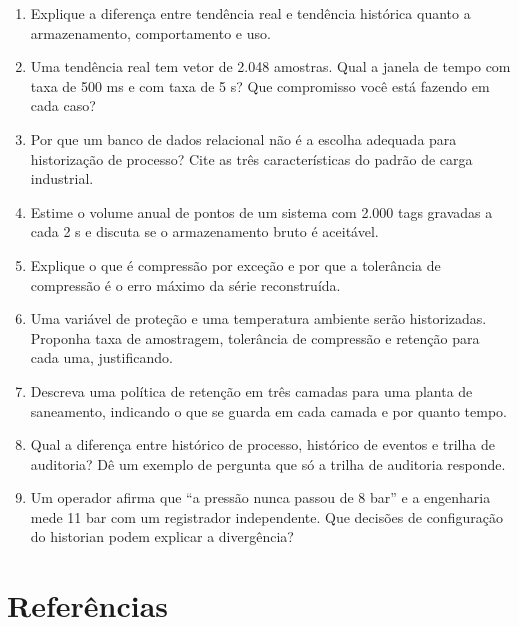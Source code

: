 \begin{enumerate}
\def\labelenumi{\arabic{enumi}.}
\tightlist
\item
  Explique a diferença entre tendência real e tendência histórica quanto a armazenamento, comportamento e uso.
\item
  Uma tendência real tem vetor de 2.048 amostras. Qual a janela de tempo com taxa de 500 ms e com taxa de 5 s? Que compromisso você está fazendo em cada caso?
\item
  Por que um banco de dados relacional não é a escolha adequada para historização de processo? Cite as três características do padrão de carga industrial.
\item
  Estime o volume anual de pontos de um sistema com 2.000 tags gravadas a cada 2 s e discuta se o armazenamento bruto é aceitável.
\item
  Explique o que é compressão por exceção e por que a tolerância de compressão é o erro máximo da série reconstruída.
\item
  Uma variável de proteção e uma temperatura ambiente serão historizadas. Proponha taxa de amostragem, tolerância de compressão e retenção para cada uma, justificando.
\item
  Descreva uma política de retenção em três camadas para uma planta de saneamento, indicando o que se guarda em cada camada e por quanto tempo.
\item
  Qual a diferença entre histórico de processo, histórico de eventos e trilha de auditoria? Dê um exemplo de pergunta que só a trilha de auditoria responde.
\item
  Um operador afirma que ``a pressão nunca passou de 8 bar'' e a engenharia mede 11 bar com um registrador independente. Que decisões de configuração do historian podem explicar a divergência?
\end{enumerate}

\section{Referências}\label{referuxeancias}

